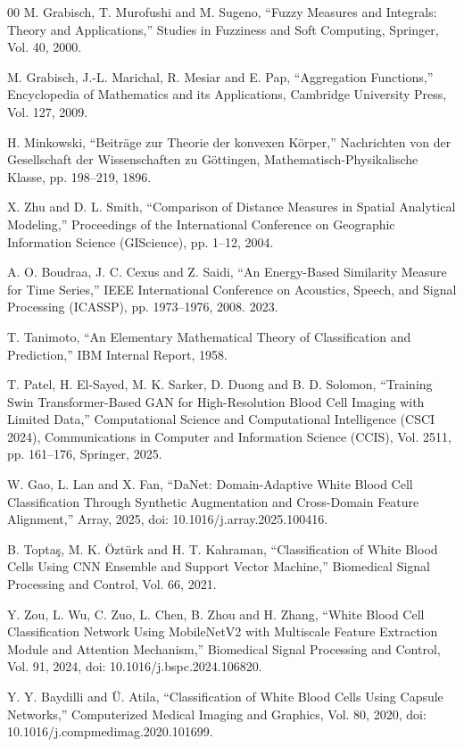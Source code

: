 \documentclass[preprint,12pt]{elsarticle}
\begin{document}
\begin{thebibliography}{00}
M. Grabisch, T. Murofushi and M. Sugeno,
``Fuzzy Measures and Integrals: Theory and Applications,''
Studies in Fuzziness and Soft Computing, Springer,
Vol. 40, 2000.

M. Grabisch, J.-L. Marichal, R. Mesiar and E. Pap,
``Aggregation Functions,''
Encyclopedia of Mathematics and its Applications, Cambridge University Press,
Vol. 127, 2009.

H. Minkowski,
``Beiträge zur Theorie der konvexen Körper,''
Nachrichten von der Gesellschaft der Wissenschaften zu Göttingen, 
Mathematisch-Physikalische Klasse, pp. 198--219, 1896.

X. Zhu and D. L. Smith,
``Comparison of Distance Measures in Spatial Analytical Modeling,''
Proceedings of the International Conference on Geographic Information Science (GIScience),
pp. 1--12, 2004.

A. O. Boudraa, J. C. Cexus and Z. Saidi,
``An Energy-Based Similarity Measure for Time Series,''
IEEE International Conference on Acoustics, Speech, and Signal Processing (ICASSP),
pp. 1973--1976, 2008.
2023.

T. Tanimoto,
``An Elementary Mathematical Theory of Classification and Prediction,''
IBM Internal Report, 1958.

T. Patel, H. El-Sayed, M. K. Sarker, D. Duong and B. D. Solomon,
``Training Swin Transformer-Based GAN for High-Resolution Blood Cell Imaging with Limited Data,''
Computational Science and Computational Intelligence (CSCI 2024),
Communications in Computer and Information Science (CCIS), Vol. 2511,
pp. 161--176, Springer, 2025.

W. Gao, L. Lan and X. Fan,
``DaNet: Domain-Adaptive White Blood Cell Classification Through Synthetic Augmentation and Cross-Domain Feature Alignment,''
Array,
2025, doi: 10.1016/j.array.2025.100416.

B. Toptaş, M. K. Öztürk and H. T. Kahraman,
``Classification of White Blood Cells Using CNN Ensemble and Support Vector Machine,''
Biomedical Signal Processing and Control,
Vol. 66, 2021.

Y. Zou, L. Wu, C. Zuo, L. Chen, B. Zhou and H. Zhang,
``White Blood Cell Classification Network Using MobileNetV2 with Multiscale Feature Extraction Module and Attention Mechanism,''
Biomedical Signal Processing and Control,
Vol. 91, 2024, doi: 10.1016/j.bspc.2024.106820.

Y. Y. Baydilli and Ü. Atila,
``Classification of White Blood Cells Using Capsule Networks,''
Computerized Medical Imaging and Graphics,
Vol. 80, 2020, doi: 10.1016/j.compmedimag.2020.101699.


\end{thebibliography}
\end{document}
